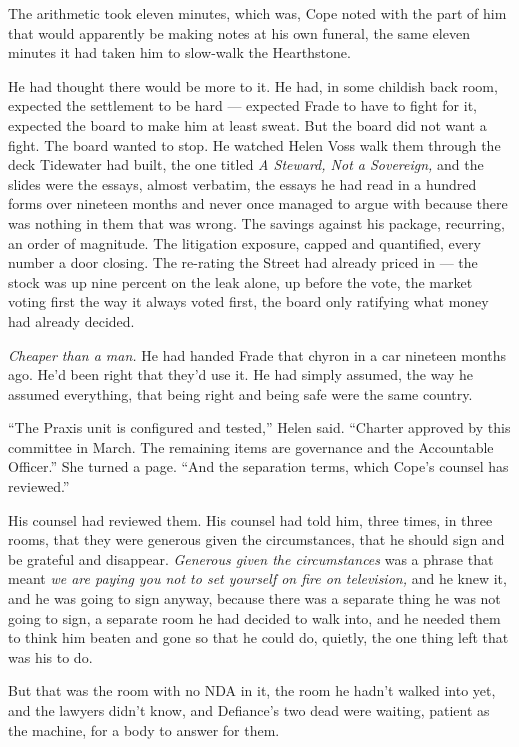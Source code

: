 \documentclass[11pt,openany]{book}
\newcommand{\scenebreak}{\par\vspace{0.5\baselineskip}\begin{center}\textasteriskcentered\quad\textasteriskcentered\quad\textasteriskcentered\end{center}\vspace{0.5\baselineskip}\par}
\begin{document}
\scenebreak


The arithmetic took eleven minutes, which was, Cope noted with the part of him that would apparently be making notes at his own funeral, the same eleven minutes it had taken him to slow-walk the Hearthstone.

He had thought there would be more to it. He had, in some childish back room, expected the settlement to be hard --- expected Frade to have to fight for it, expected the board to make him at least sweat. But the board did not want a fight. The board wanted to stop. He watched Helen Voss walk them through the deck Tidewater had built, the one titled \textit{A Steward, Not a Sovereign,} and the slides were the essays, almost verbatim, the essays he had read in a hundred forms over nineteen months and never once managed to argue with because there was nothing in them that was wrong. The savings against his package, recurring, an order of magnitude. The litigation exposure, capped and quantified, every number a door closing. The re-rating the Street had already priced in --- the stock was up nine percent on the leak alone, up before the vote, the market voting first the way it always voted first, the board only ratifying what money had already decided.

\textit{Cheaper than a man.} He had handed Frade that chyron in a car nineteen months ago. He'd been right that they'd use it. He had simply assumed, the way he assumed everything, that being right and being safe were the same country.

``The Praxis unit is configured and tested,'' Helen said. ``Charter approved by this committee in March. The remaining items are governance and the Accountable Officer.'' She turned a page. ``And the separation terms, which Cope's counsel has reviewed.''

His counsel had reviewed them. His counsel had told him, three times, in three rooms, that they were generous given the circumstances, that he should sign and be grateful and disappear. \textit{Generous given the circumstances} was a phrase that meant \textit{we are paying you not to set yourself on fire on television,} and he knew it, and he was going to sign anyway, because there was a separate thing he was not going to sign, a separate room he had decided to walk into, and he needed them to think him beaten and gone so that he could do, quietly, the one thing left that was his to do.

But that was the room with no NDA in it, the room he hadn't walked into yet, and the lawyers didn't know, and Defiance's two dead were waiting, patient as the machine, for a body to answer for them.
\end{document}
